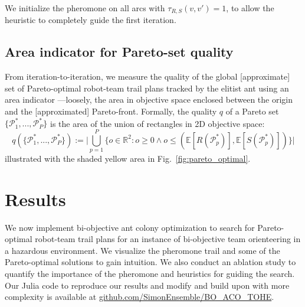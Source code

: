 \documentclass[fleqn,10pt,lineno]{wlpeerj}
\begin{document}
We initialize the pheromone on all arcs with $\tau_{R,S}(v, v\prime)=1$, to allow the heuristic to completely guide the first iteration. 




\subsection{Area indicator for Pareto-set quality}
From iteration-to-iteration, we measure the quality of the global [approximate] set of Pareto-optimal robot-team trail plans tracked by the elitist ant using an area indicator \cite{cao2015using,guerreiro2020hypervolume}---loosely, the area in objective space enclosed between the origin and the [approximated] Pareto-front. Formally, the quality $q$ of a Pareto set $\{\mathcal{P}^*_1, ...,\mathcal{P}^*_P\}$ is the area of the union of rectangles in 2D objective space:
\begin{equation}
	q(\{\mathcal{P}^*_1, ...,\mathcal{P}^*_{P}\}):=
	\Big \lvert 
		\bigcup_{p=1}^P \{ o \in \mathbb{R}^2 : o \geq 0 \wedge  o \leq (\mathbb{E}[R(\mathcal{P}^*_p)], \mathbb{E}[S(\mathcal{P}^*_p)]) \} 
	\Big \rvert \label{eq:q}
\end{equation}
illustrated with the shaded yellow area in Fig.~\ref{fig:pareto_optimal}.

\section{Results}
We now implement bi-objective ant colony optimization to search for Pareto-optimal robot-team trail plans for an instance of bi-objective team orienteering in a hazardous environment. 
We visualize the pheromone trail and some of the Pareto-optimal solutions to gain intuition. We also conduct an ablation study to quantify the importance of the pheromone and heuristics for guiding the search.
Our Julia code to reproduce our results and modify and build upon with more complexity is available at \url{github.com/SimonEnsemble/BO_ACO_TOHE}.
\end{document}
